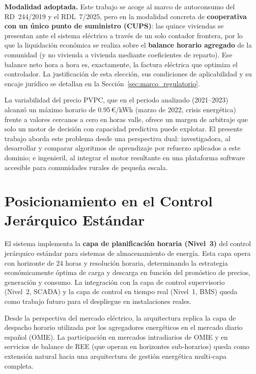 \documentclass[12pt, a4paper, twoside]{report}
\begin{document}
\textbf{Modalidad adoptada.} Este trabajo se acoge al marco de autoconsumo del
RD~244/2019 y el RDL~7/2025, pero en la modalidad concreta de \textbf{cooperativa
con un único punto de suministro (CUPS)}: las quince viviendas se presentan ante
el sistema eléctrico a través de un solo contador frontera, por lo que la
liquidación económica se realiza sobre el \textbf{balance horario agregado} de la
comunidad (y no vivienda a vivienda mediante coeficientes de reparto). Ese balance
neto hora a hora es, exactamente, la factura eléctrica que optimiza el controlador.
La justificación de esta elección, sus condiciones de aplicabilidad y su encaje
jurídico se detallan en la Sección~\ref{sec:marco_regulatorio}.

La variabilidad del precio PVPC, que en el periodo analizado (2021--2023)
alcanzó un máximo horario de \num{0,95}\,€/kWh (marzo de 2022, crisis
energética) frente a valores cercanos a cero en horas valle, ofrece un margen
de arbitraje que solo un motor de decisión con capacidad predictiva puede
explotar. El
presente trabajo aborda este problema desde una perspectiva dual: investigadora,
al desarrollar y comparar algoritmos de aprendizaje por refuerzo aplicados a
este dominio; e ingenieril, al integrar el motor resultante en una plataforma
software accesible para comunidades rurales de pequeña escala.

\section{Posicionamiento en el Control Jerárquico Estándar}

El sistema implementa la \textbf{capa de planificación horaria (Nivel~3)} del
control jerárquico estándar para sistemas de almacenamiento de energía. Esta
capa opera con horizonte de 24 horas y resolución horaria, determinando la
estrategia económicamente óptima de carga y descarga en función del pronóstico
de precios, generación y consumo. La integración con la capa de control
supervisorio (Nivel~2, SCADA) y la capa de control en tiempo real (Nivel~1,
BMS) queda como trabajo futuro para el despliegue en instalaciones reales.

Desde la perspectiva del mercado eléctrico, la arquitectura replica la capa de
despacho horario utilizada por los agregadores energéticos en el mercado diario
español (OMIE). La participación en mercados intradiarios de OMIE y en servicios
de balance de REE (que operan en horizontes sub-horarios) queda como extensión
natural hacia una arquitectura de gestión energética multi-capa completa.
\end{document}
